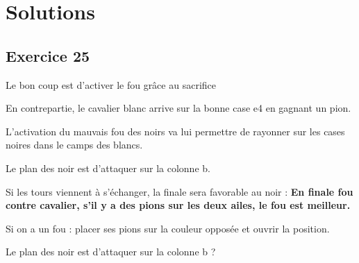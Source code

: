 
\newpage
\section{Solutions}

\subsection{Exercice 25}%
\newgame
{}
\begin{minipage}{0.45\textwidth}
\hspace{0.7cm} Le bon coup est d'activer le fou grâce au sacrifice 
\vspace{0.25cm}

\hspace{0.7cm} En contrepartie, le cavalier blanc arrive sur la bonne case e4 en gagnant un pion.
\vspace{0.25cm}

\hspace{0.7cm} L'activation du mauvais fou des noirs va lui permettre de rayonner sur les cases noires dans le camps des blancs. 
\vspace{0.25cm}

\hspace{0.7cm} Le plan des noir est d'attaquer sur la colonne b.
\end{minipage}
\hfill
\begin{minipage}{0.45\textwidth}
\chessboard[
inverse,markstyle=leftborder,
]
\end{minipage}

\begin{minipage}{0.45\textwidth}

{\footnotesize 
\hspace{0.7cm}Si les tours viennent à s'échanger, la finale sera favorable au noir : 
{\bf En finale fou contre cavalier, s'il y a des pions sur les deux ailes, le fou est meilleur.}

\hspace{0.7cm}{\bf Il faut rendre la position favorable pour nos pièces légères.} Si on a un fou : placer ses pions sur la couleur opposée et ouvrir la position.
}

\hspace{0.7cm} Le plan des noir est d'attaquer sur la colonne b ?
\vspace{0.25cm}

\hspace{0.7cm} %
\vspace{0.25cm}
\end{minipage}
\hfill
\begin{minipage}{0.45\textwidth}
\chessboard[
inverse,markstyle=leftborder,
]
\end{minipage}

